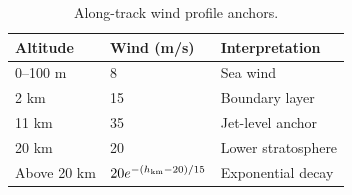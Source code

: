 \begin{table}[htbp]
\caption{Along-track wind profile anchors.}
\label{tab:src3}
\small
\setlength{\tabcolsep}{3.5pt}
\begin{tabularx}{\linewidth}{@{}lXX@{}}
\toprule
Altitude & Wind (m/s) & Interpretation \\
\midrule
0--100 m & 8 & Sea wind \\
2 km & 15 & Boundary layer \\
11 km & 35 & Jet-level anchor \\
20 km & 20 & Lower stratosphere \\
Above 20 km & $20e^{-(h_{\rm km}-20)/15}$ & Exponential decay \\
\bottomrule
\end{tabularx}
\end{table}
